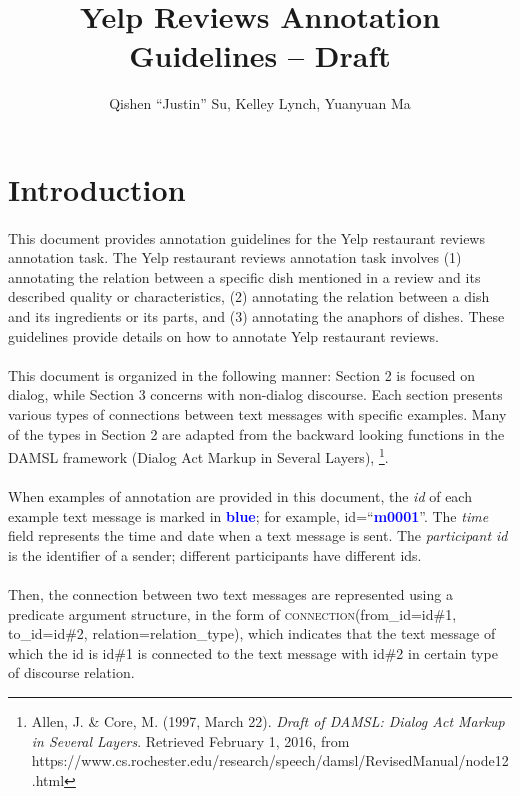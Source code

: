 \documentclass{article}
\title{Yelp Reviews Annotation Guidelines -- Draft}
\author{Qishen ``Justin'' Su, Kelley Lynch, Yuanyuan Ma}
\begin{document}
\newpage
{}
\maketitle

\tableofcontents

\newpage
\section{Introduction}
\paragraph{}
This document provides annotation guidelines for the Yelp restaurant reviews annotation task. The Yelp restaurant reviews annotation task involves (1) annotating the relation between a specific dish mentioned in a review and its described quality or characteristics, (2) annotating the relation between a dish and its ingredients or its parts, and (3) annotating the anaphors of dishes. These guidelines provide details on how to annotate Yelp restaurant reviews. 
\paragraph{}
This document is organized in the following manner: Section 2 is focused on dialog, while Section 3 concerns with non-dialog discourse. Each section presents various types of connections between text messages with specific examples. Many of the types in Section 2 are adapted from the backward looking functions in the DAMSL framework (Dialog Act Markup in Several Layers), \footnote{Allen, J. \& Core, M. (1997, March 22). \textit{Draft of DAMSL: Dialog Act Markup in Several Layers}. Retrieved February 1, 2016, from https://www.cs.rochester.edu/research/speech/damsl/RevisedManual/node12.html}.
\paragraph{}
When examples of annotation are provided in this document, the \textit{id} of each example text message is marked in \textbf{\textcolor{blue}{blue}}; for example, id=``\textbf{\textcolor{blue}{m0001}}''. The \textit{time} field represents the time and date when a text message is sent. The \textit{participant id} is the identifier of a sender; different participants have different ids.
\paragraph{}
Then, the connection between two text messages are represented using a predicate argument structure, in the form of \textsc{connection}(from\_id=id\#1, to\_id=id\#2, relation=relation\_type), which indicates that the text message of which the id is id\#1 is connected to the text message with id\#2 in certain type of discourse relation.
\end{document}
